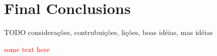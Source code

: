 



\section{Final Conclusions}





TODO considerações, contrubuições, lições, boas idéias, mas idéias



\textcolor{red}{some text here}








